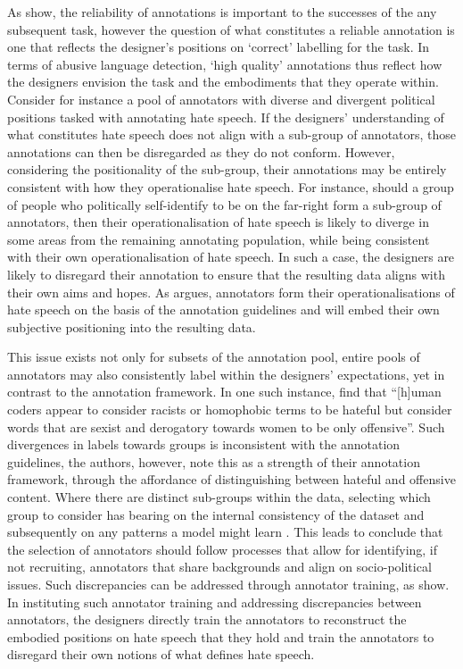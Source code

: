 As \citet{Hovy:2013} show, the reliability of annotations is important to the successes of the any subsequent task, however the question of what constitutes a reliable annotation is one that reflects the designer's positions on `correct' labelling for the task. In terms of abusive language detection, `high quality' annotations thus reflect how the designers envision the task and the embodiments that they operate within. Consider for instance a pool of annotators with diverse and divergent political positions tasked with annotating hate speech. If the designers' understanding of what constitutes hate speech does not align with a sub-group of annotators, those annotations can then be disregarded as they do not conform. However, considering the positionality of the sub-group, their annotations may be entirely consistent with how they operationalise hate speech. For instance, should a group of people who politically self-identify to be on the far-right form a sub-group of annotators, then their operationalisation of hate speech is likely to diverge in some areas from the remaining annotating population, while being consistent with their own operationalisation of hate speech. In such a case, the designers are likely to disregard their annotation to ensure that the resulting data aligns with their own aims and hopes. As \citet{Waseem:2016} argues, annotators form their operationalisations of hate speech on the basis of the annotation guidelines and will embed their own subjective positioning into the resulting data.

This issue exists not only for subsets of the annotation pool, entire pools of annotators may also consistently label within the designers' expectations, yet in contrast to the annotation framework. In one such instance, \citet{Davidson:2017} find that ``[h]uman coders appear to consider racists or homophobic terms to be hateful but consider words that are sexist and derogatory towards women to be only offensive''. Such divergences in labels towards groups is inconsistent with the annotation guidelines, the authors, however, note this as a strength of their annotation framework, through the affordance of distinguishing between hateful and offensive content.
Where there are distinct sub-groups within the data, selecting which group to consider has bearing on the internal consistency of the dataset and subsequently on any patterns a model might learn \citep{Waseem:2016}. This leads \citep{Waseem:2016} to conclude that the selection of annotators should follow processes that allow for identifying, if not recruiting, annotators that share backgrounds and align on socio-political issues.
Such discrepancies can be addressed through annotator training, as \citet{Vidgen:2020} show. In instituting such annotator training and addressing discrepancies between annotators, the designers directly train the annotators to reconstruct the embodied positions on hate speech that they hold and train the annotators to disregard their own notions of what defines hate speech.

